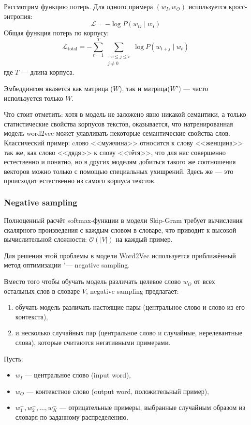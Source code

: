 \documentclass[coursework]{SCWorks}
\begin{document}
Рассмотрим функцию потерь.
Для одного примера $(w_I, w_O)$ используется кросс-энтропия:
\[
\mathcal{L} = -\log P(w_O \mid w_I)
\]
Общая функция потерь по корпусу:
\[
\mathcal{L}_{\text{total}} = -\sum_{t=1}^{T} \sum_{\substack{-c \leq j \leq c \\ j \ne 0}} \log P(w_{t+j} \mid w_t)
\]
где $T$ — длина корпуса.

Эмбеддингом является как матрица ($W$), так и матрица($W'$) — часто используется только $W$. 

Что стоит отметить: хотя в модель не заложено явно никакой семантики, а только статистические свойства корпусов текстов, оказывается, что натренированная модель word2vec может улавливать некоторые семантические свойства слов. Классический пример: cлово <<мужчина>> относится к слову <<женщина>> так же, как слово <<дядя>> к слову <<тётя>>, что для нас совершенно естественно и понятно, но в других моделям добиться такого же соотношения векторов можно только с помощью специальных ухищрений. Здесь же — это происходит естественно из самого корпуса текстов.

\subsubsection{Negative sampling}
Полноценный расчёт softmax-функции в модели Skip-Gram требует вычисления скалярного произведения с каждым словом в словаре, что приводит к высокой вычислительной сложности: $\mathcal{O}(|V|)$ на каждый пример.

Для решения этой проблемы в модели Word2Vec используется приближённый метод оптимизации "--- negative sampling.

Вместо того чтобы обучать модель различать целевое слово $w_O$ от всех остальных слов в словаре $V$, negative sampling предлагает:
\begin{enumerate}
  \item обучать модель различать настоящие пары (центральное слово и слово из его контекста),
  \item и несколько случайных пар (центральное слово и случайные, нерелевантные слова), которые считаются негативными примерами.
\end{enumerate}

Пусть:
\begin{itemize}
  \item $w_I$ — центральное слово (input word),
  \item $w_O$ — контекстное слово (output word, положительный пример),
  \item $w_1^-, w_2^-, \dots, w_K^-$ — отрицательные примеры, выбранные случайным образом из словаря по заданному распределению.
\end{itemize}
\end{document}
